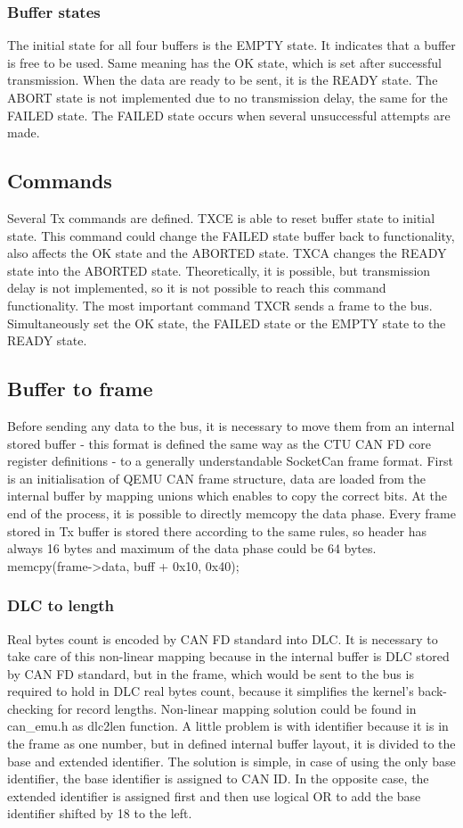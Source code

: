 \documentclass{ctuthesis}
\begin{document}
  \subsubsection{Buffer states}
  The initial state for all four buffers is the EMPTY state. It indicates that a buffer is free to be used. Same meaning has the OK state, which is set after successful transmission. When the data are ready to be sent, it is the READY state. The ABORT state is not implemented due to no transmission delay, the same for the FAILED state. The FAILED state occurs when several unsuccessful attempts are made.
 
 \subsection{Commands}
  Several Tx commands are defined. TXCE is able to reset buffer state to initial state. This command could change the FAILED state buffer back to functionality, also affects the OK state and the ABORTED state. TXCA changes the READY state into the ABORTED state. Theoretically, it is possible, but transmission delay is not implemented, so it is not possible to reach this command functionality. The most important command TXCR sends a frame to the bus. Simultaneously set the OK state, the FAILED state or the EMPTY state to the READY state.
 
 \subsection{Buffer to frame}
  Before sending any data to the bus, it is necessary to move them from an internal stored buffer - this format is defined the same way as the CTU CAN FD core register definitions - to a generally understandable SocketCan frame format. First is an initialisation of QEMU CAN frame structure, data are loaded from the internal buffer by mapping unions which enables to copy the correct bits. At the end of the process, it is possible to directly memcopy the data phase. Every frame stored in Tx buffer is stored there according to the same rules, so header has always 16 bytes and maximum of the data phase could be 64 bytes.
  memcpy(frame->data, buff + 0x10, 0x40);
 
  \subsubsection{DLC to length}
   Real bytes count is encoded by CAN FD standard into DLC. It is necessary to take care of this non-linear mapping because in the internal buffer is DLC stored by CAN FD standard, but in the frame, which would be sent to the bus is required to hold in DLC real bytes count, because it simplifies the kernel's back-checking for record lengths. Non-linear mapping solution could be found in can\_emu.h as dlc2len function. A little problem is with identifier because it is in the frame as one number, but in defined internal buffer layout, it is divided to the base and extended identifier. The solution is simple, in case of using the only base identifier, the base identifier is assigned to CAN ID. In the opposite case, the extended identifier is assigned first and then use logical OR to add the base identifier shifted by 18 to the left. 
   
\end{document}
